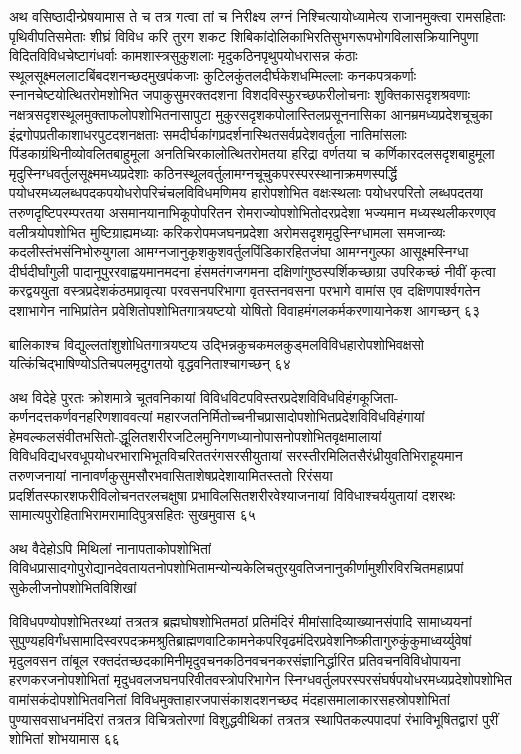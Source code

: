 अथ वसिष्ठादीन्प्रेषयामास ते च तत्र गत्वा तां च निरीक्ष्य लग्नं निश्चित्यायोध्यामेत्य
राजानमुक्त्वा रामसहिताः पृथिवीपतिसमेताः शीघ्रं विविध करि तुरग शकट
शिबिकांदोलिकाभिरतिसुभगरूपभोगविलासक्रियानिपुणा विदितविविधचेष्टागंधर्वाः
कामशास्त्रसुकुशलाः मृदुकठिनपृथुपयोधरासन्न कंठाः स्थूलसूक्ष्मललाटबिंबदशनच्छदमुखपंकजाः
कुटिलकुंतलदीर्घकेशधम्मिल्लाः कनकपत्रकर्णाः स्नानचेष्टयोत्थितरोमशोभित जपाकुसुमरक्तदशना
विशदविस्फुरच्छफरीलोचनाः शुक्तिकासदृशश्रवणाः नक्षत्रसदृशस्थूलमुक्ताफलोपशोभितनासापुटा
मुकुरसदृशकपोलास्तिलप्रसूननासिका आनम्रमध्यप्रदेशचूचुका इंद्रगोपप्रतीकाशाधरपुटदशनक्षताः
समदीर्घकांगप्रदर्शनास्थितसर्वप्रदेशवर्तुला नातिमांसलाः पिंडकाग्रंथिनीव्योवलितबाहुमूला
अनतिचिरकालोत्थितरोमतया हरिद्रा वर्णतया च कर्णिकारदलसदृशबाहुमूला
मृदुस्निग्धवर्तुलसूक्ष्ममध्यप्रदेशाः कठिनस्थूलवर्तुलामग्नचूचुकपरस्परस्थानाक्रमणस्पर्द्धि
पयोधरमध्यलब्धपदकपयोधरोपरिचंचलविविधमणिमय हारोपशोभित वक्षःस्थलाः पयोधरपरितो
लब्धपदतया तरुणदृष्टिपरम्परतया असमानयानाभिकूपोपरितन रोमराज्योपशोभितोदरप्रदेशा
भज्यमान मध्यस्थलीकरणएव वलीत्रयोपशोभित मुष्टिग्राह्यमध्याः करिकरोपमजघनप्रदेशा
अरोमसदृशमृदुस्निग्धामला समजान्व्यः कदलीस्तंभसंनिभोरुयुगला
आमग्नजानुकृशकुशवर्तुलपिंडिकारहितजंघा आमग्नगुल्फा आसूक्ष्मस्निग्धा दीर्घदीर्घांगुली
पादानूपुररवाह्वयमानमदना हंसमतंगजगमना दक्षिणांगुष्ठस्पर्शिकच्छाग्रा उपरिकच्छं नीवीं कृत्वा
करद्वययुता वस्त्रप्रदेशकंठमप्रावृत्या परवसनपरिभागा वृतस्तनवसना परभागे वामांस एव
दक्षिणपार्श्वगतेन दशाभागेन नाभिप्रांतेन प्रवेशितोपशोभितगात्रयष्टयो योषितो
विवाहमंगलकर्मकरणायानेकश आगच्छन् ६३

बालिकाश्च विद्युल्लतांशुशोधितगात्रयष्टय उद्भिन्नकुचकमलकुड्मलविविधहारोपशोभिवक्षसो
यत्किंचिद्भाषिण्योऽतिचपलमृदुगतयो वृद्धवनिताश्चागच्छन् ६४

अथ विदेहे पुरतः क्रोशमात्रे चूतवनिकायां
विविधविटपविस्तरप्रदेशविविधविहंगकूजिता-कर्णनदत्तकर्णवनहरिणशाववत्यां
महारजतनिर्मितोच्चनीचप्रासादोपशोभितप्रदेशविविधविहंगायां
हेमवल्कलसंवीतभसितो-द्धूलितशरीरजटिलमुनिगणध्यानोपासनोपशोभितवृक्षमालायां
विविधविद्यधरवधूपयोधरभाराभिभूतविचरिततरंगसरसीयुतायां
सरस्तीरमिलितसैरंध्रीयुवतिभिराहूयमान तरुणजनायां
नानावर्णकुसुमसौरभवासिताशेषप्रदेशायामितस्ततो रिरंसया
प्रदर्शितस्फारशफरीविलोचनतरलचक्षुषा प्रभाविलसितशरीरवेश्याजनायां विविधाश्चर्ययुतायां
दशरथः सामात्यपुरोहिताभिरामरामादिपुत्रसहितः सुखमुवास ६५

अथ वैदेहोऽपि मिथिलां नानापताकोपशोभितां
विविधप्रासादगोपुरोद्यानदेवतायतनोपशोभितामन्योन्यकेलिचतुरयुवतिजनानुकीर्णामुशीरविरचितमहाप्रपां
सुकेलीजनोपशोभितविशिखां

विविधपण्योपशोभितरथ्यां तत्रतत्र ब्रह्मघोषशोभितमठां प्रतिमंदिरं मीमांसादिव्याख्यानसंपादि
सामाध्ययनां
सुपुण्यहविर्गंधसामादिस्वरपदक्रमश्रुतिब्राह्मणवाटिकामनेकपरिवृढमंदिरप्रवेशनिष्क्रीतागुरुकुंकुमाध्वर्य्युवेषां
मृदुलवसन तांबूल रक्तदंतच्छदकामिनीमृदुवचनकठिनवचनकरसंज्ञानिर्द्धारित प्रतिवचनविविधोपायना
हरणकरजनोपशोभितां मृदुधवलजघनपरिवीतवस्त्रोपरिभागेन
स्निग्धवर्तुलपरस्परसंघर्षपयोधरमध्यप्रदेशोपशोभित वामांसकंदोपशोभितवनितां
विविधमुक्ताहारजपासंकाशदशनच्छद मंदहासमालाकारसहस्रोपशोभितां पुण्यासवसाधनमंदिरां
तत्रतत्र विचित्रतोरणां विशुद्धवीथिकां तत्रतत्र स्थापितकल्पपादपां रंभाविभूषितद्वारां पुरीं
शोभितां शोभयामास ६६


